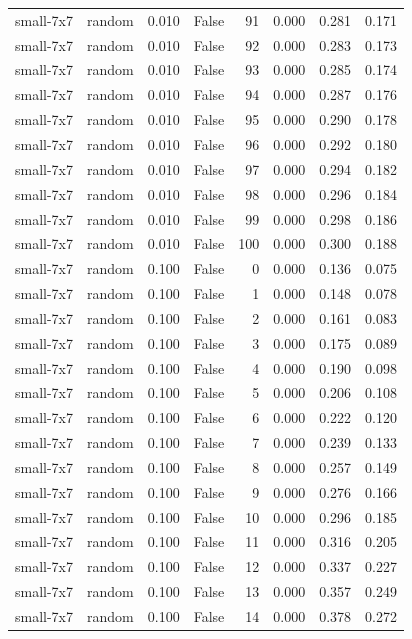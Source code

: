 \begin{tabular}{llrrrrrr}
small-7x7 & random & 0.010 & False & 91 & 0.000 & 0.281 & 0.171 \\
small-7x7 & random & 0.010 & False & 92 & 0.000 & 0.283 & 0.173 \\
small-7x7 & random & 0.010 & False & 93 & 0.000 & 0.285 & 0.174 \\
small-7x7 & random & 0.010 & False & 94 & 0.000 & 0.287 & 0.176 \\
small-7x7 & random & 0.010 & False & 95 & 0.000 & 0.290 & 0.178 \\
small-7x7 & random & 0.010 & False & 96 & 0.000 & 0.292 & 0.180 \\
small-7x7 & random & 0.010 & False & 97 & 0.000 & 0.294 & 0.182 \\
small-7x7 & random & 0.010 & False & 98 & 0.000 & 0.296 & 0.184 \\
small-7x7 & random & 0.010 & False & 99 & 0.000 & 0.298 & 0.186 \\
small-7x7 & random & 0.010 & False & 100 & 0.000 & 0.300 & 0.188 \\
small-7x7 & random & 0.100 & False & 0 & 0.000 & 0.136 & 0.075 \\
small-7x7 & random & 0.100 & False & 1 & 0.000 & 0.148 & 0.078 \\
small-7x7 & random & 0.100 & False & 2 & 0.000 & 0.161 & 0.083 \\
small-7x7 & random & 0.100 & False & 3 & 0.000 & 0.175 & 0.089 \\
small-7x7 & random & 0.100 & False & 4 & 0.000 & 0.190 & 0.098 \\
small-7x7 & random & 0.100 & False & 5 & 0.000 & 0.206 & 0.108 \\
small-7x7 & random & 0.100 & False & 6 & 0.000 & 0.222 & 0.120 \\
small-7x7 & random & 0.100 & False & 7 & 0.000 & 0.239 & 0.133 \\
small-7x7 & random & 0.100 & False & 8 & 0.000 & 0.257 & 0.149 \\
small-7x7 & random & 0.100 & False & 9 & 0.000 & 0.276 & 0.166 \\
small-7x7 & random & 0.100 & False & 10 & 0.000 & 0.296 & 0.185 \\
small-7x7 & random & 0.100 & False & 11 & 0.000 & 0.316 & 0.205 \\
small-7x7 & random & 0.100 & False & 12 & 0.000 & 0.337 & 0.227 \\
small-7x7 & random & 0.100 & False & 13 & 0.000 & 0.357 & 0.249 \\
small-7x7 & random & 0.100 & False & 14 & 0.000 & 0.378 & 0.272 \\

\end{tabular}
